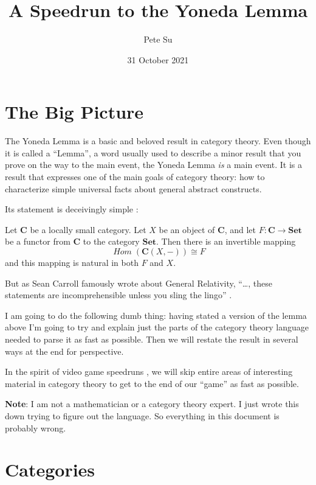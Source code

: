 \documentclass[12pt]{article}
\theoremstyle{definition}
\theoremstyle{definition}
\theoremstyle{definition}
\numberwithin{equation}{section}
\newcommand{\cat}[1]{\mathbf{#1}}      %
\newcommand{\fcat}[1]{{\mathbf {#1}}}    %
\newcommand{\CC}{\cat{C}}
\DeclareMathOperator{\Hom}{\mathit{Hom}}
\newcommand{\Set}{\fcat{Set}}           %
\newcommand{\iso}{\cong}                %
\def\pg{\bigskip\goodbreak
\ni}
\def\ni{\goodbreak\noindent}
\begin{document}
\title{\Large A Speedrun to the Yoneda Lemma}
\author{\large Pete Su}
\date{\large 31 October 2021}

\maketitle


\section{The Big Picture}

The Yoneda Lemma is a basic and beloved result in category theory. Even though it is called
a ``Lemma'', a word usually used to describe a minor result that you prove on the way
to the main event, the Yoneda Lemma {\it is} a main event. It is a result that expresses
one of the main goals of category theory: how to characterize simple universal facts
about general abstract constructs.

Its statement is deceivingly simple \cite{Rhiel2016}:

\pg
Let $\CC$ be a locally small category. Let $X$ be an
object of $\CC$, and let $F: \CC \to \Set$ be a functor from $\CC$ to the category $\Set$.
Then there is an invertible mapping
$$
\Hom(\CC(X, -)) \iso F
$$
and this mapping is natural in both $F$ and $X$.

\pg
But as Sean Carroll famously wrote about General Relativity, ``\dots, 
these statements are incomprehensible unless you sling the lingo'' \cite{carroll}.

I am going to do the following dumb thing: having stated a version of the lemma above
I'm going to try and explain just the parts of the category theory language needed to parse it
as fast as possible. Then we will restate the result in several ways at the end for perspective.

In the spirit of video game speedruns \cite{lobos},
we will skip entire areas of interesting material in category theory to get to the end
of our ``game'' as fast as possible.

\pg
{\bf Note}: I am not a mathematician or a category theory expert. I just wrote this
down trying to figure out the language.
So everything in this document is probably wrong.

\goodbreak
\section{Categories}
\end{document}
